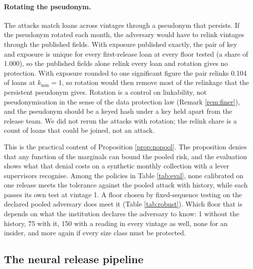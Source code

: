 \documentclass[11pt,a4paper]{article}
\theoremstyle{plain}
\theoremstyle{definition}
\theoremstyle{definition}
\theoremstyle{plain}
\begin{document}
\paragraph{Rotating the pseudonym.} The attacks match loans across vintages
through a pseudonym that persists. If the pseudonym rotated each month, the
adversary would have to relink vintages through the published fields. With
exposure published exactly, the pair of key and exposure is unique for every
first-release loan at every floor tested (a share of 1.000), so the published
fields alone relink every loan and rotation gives no protection. With exposure
rounded to one significant figure the pair relinks 0.104 of loans at $k_{\min} =
1$, so rotation would then remove most of the relinkage that the persistent
pseudonym gives. Rotation is a control on linkability, not pseudonymisation in
the sense of the data protection law (Remark \ref{rem:finer}), and the pseudonym
should be a keyed hash under a key held apart from the release team. We did not
rerun the attacks with rotation; the relink share is a count of loans that could
be joined, not an attack.

This is the practical content of Proposition \ref{prop:nopool}. The proposition
denies that any function of the marginals can bound the pooled risk, and the
evaluation shows what that denial costs on a synthetic monthly collection with
a lever supervisors recognise. Among the policies in Table \ref{tab:eval}, none
calibrated on one release meets the tolerance against the pooled attack with
history, while each passes its own test at vintage 1. A floor chosen by
fixed-sequence testing on the declared pooled adversary does meet it (Table
\ref{tab:robust}). Which floor that is depends on what the institution declares
the adversary to know: 1 without the history, 75 with it, 150 with a reading in
every vintage as well, none for an insider, and more again if every size class
must be protected.

\subsection{The neural release pipeline}\label{sec:eval-neural}
\end{document}
